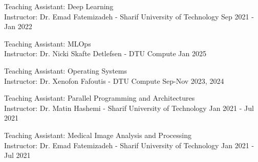 {        \multicolentry{*, 3.3cm}
        {
            Teaching Assistant: Deep Learning\\
            Instructor: Dr. Emad Fatemizadeh - Sharif University of Technology
        }
        {\raggedleft Sep 2021 - Jan 2022}

        \vspace{0.2 cm}

        \multicolentry{*, 3.3cm}
        {
            Teaching Assistant: MLOps\\
            Instructor: Dr. Nicki Skafte Detlefsen - DTU Compute
        }
        {\raggedleft Jan 2025}

        \vspace{0.2 cm}

        \multicolentry{*, 3.3cm}
        {
            Teaching Assistant: Operating Systems\\
            Instructor: Dr. Xenofon Fafoutis - DTU Compute
        }
        {\raggedleft Sep-Nov 2023, 2024}

        \vspace{0.2 cm}

        \multicolentry{*, 3.3cm}
        {
            Teaching Assistant: Parallel Programming and Architectures\\
            Instructor: Dr. Matin Hashemi - Sharif University of Technology
        }
        {\raggedleft Jan 2021 - Jul 2021}

        \vspace{0.2 cm}

        \multicolentry{*, 3.3cm}
        {
            Teaching Assistant: Medical Image Analysis and Processing\\
            Instructor: Dr. Emad Fatemizadeh - Sharif University of Technology
        }
        {\raggedleft Jan 2021 - Jul 2021}
    }{}

